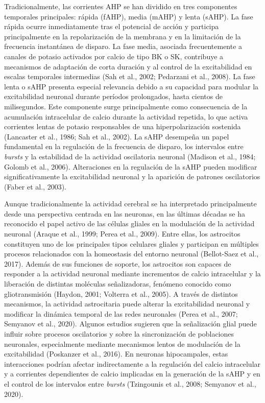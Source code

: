 \documentclass[12pt,a4paper]{report}
\begin{document}
Tradicionalmente, las corrientes AHP se han dividido en tres componentes temporales principales: rápida (fAHP), media (mAHP) y lenta (sAHP). La fase rápida ocurre inmediatamente tras el potencial de acción y participa principalmente en la repolarización de la membrana y en la limitación de la frecuencia instantánea de disparo. La fase media, asociada frecuentemente a canales de potasio activados por calcio de tipo BK o SK, contribuye a mecanismos de adaptación de corta duración y al control de la excitabilidad en escalas temporales intermedias (Sah et al., 2002; Pedarzani et al., 2008). La fase lenta o sAHP presenta especial relevancia debido a su capacidad para modular la excitabilidad neuronal durante períodos prolongados, hasta cientos de milisegundos. Este componente surge principalmente como consecuencia de la acumulación intracelular de calcio durante la actividad repetida, lo que activa corrientes lentas de potasio responsables de una hiperpolarización sostenida (Lancaster et al., 1986; Sah et al., 2002). La sAHP desempeña un papel fundamental en la regulación de la frecuencia de disparo, los intervalos entre \textit{bursts} y la estabilidad de la actividad oscilatoria neuronal (Madison et al., 1984; Golomb et al., 2006). Alteraciones en la regulación de la sAHP pueden modificar significativamente la excitabilidad neuronal y la aparición de patrones oscilatorios (Faber et al., 2003).

Aunque tradicionalmente la actividad cerebral se ha interpretado principalmente desde una perspectiva centrada en las neuronas, en las últimas décadas se ha reconocido el papel activo de las células gliales en la modulación de la actividad neuronal (Araque et al., 1999; Perea et al., 2009). Entre ellas, los astrocitos constituyen uno de los principales tipos celulares gliales y participan en múltiples procesos relacionados con la homeostasis del entorno neuronal (Bellot-Saez et al., 2017). Además de sus funciones de soporte, los astrocitos son capaces de responder a la actividad neuronal mediante incrementos de calcio intracelular y la liberación de distintas moléculas señalizadoras, fenómeno conocido como gliotransmisión (Haydon, 2001; Volterra et al., 2005). A través de distintos mecanismos, la actividad astrocitaria puede alterar la excitabilidad neuronal y modificar la dinámica temporal de las redes neuronales (Perea et al., 2007; Semyanov et al., 2020). Algunos estudios sugieren que la señalización glial puede influir sobre procesos oscilatorios y sobre la sincronización de poblaciones neuronales, especialmente mediante mecanismos lentos de modulación de la excitabilidad (Poskanzer et al., 2016). En neuronas hipocampales, estas interacciones podrían afectar indirectamente a la regulación del calcio intracelular y a corrientes dependientes de calcio implicadas en la generación de la sAHP y en el control de los intervalos entre \textit{bursts} (Tzingounis et al., 2008; Semyanov et al., 2020).
\end{document}
